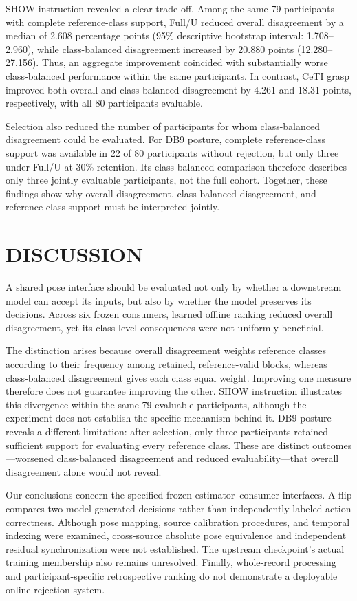 \documentclass[conference,letterpaper]{IEEEtran}
\begin{document}
SHOW instruction revealed a clear trade-off. Among the same 79 participants with complete reference-class support, Full/U reduced overall disagreement by a median of 2.608 percentage points (95\% descriptive bootstrap interval: 1.708--2.960), while class-balanced disagreement increased by 20.880 points (12.280--27.156). Thus, an aggregate improvement coincided with substantially worse class-balanced performance within the same participants. In contrast, CeTI grasp improved both overall and class-balanced disagreement by 4.261 and 18.31 points, respectively, with all 80 participants evaluable.

Selection also reduced the number of participants for whom class-balanced disagreement could be evaluated. For DB9 posture, complete reference-class support was available in 22 of 80 participants without rejection, but only three under Full/U at 30\% retention. Its class-balanced comparison therefore describes only three jointly evaluable participants, not the full cohort. Together, these findings show why overall disagreement, class-balanced disagreement, and reference-class support must be interpreted jointly.



\section{DISCUSSION}\label{discussion}
A shared pose interface should be evaluated not only by whether a downstream model can accept its inputs, but also by whether the model preserves its decisions. Across six frozen consumers, learned offline ranking reduced overall disagreement, yet its class-level consequences were not uniformly beneficial.

The distinction arises because overall disagreement weights reference classes according to their frequency among retained, reference-valid blocks, whereas class-balanced disagreement gives each class equal weight. Improving one measure therefore does not guarantee improving the other. SHOW instruction illustrates this divergence within the same 79 evaluable participants, although the experiment does not establish the specific mechanism behind it. DB9 posture reveals a different limitation: after selection, only three participants retained sufficient support for evaluating every reference class. These are distinct outcomes---worsened class-balanced disagreement and reduced evaluability---that overall disagreement alone would not reveal.

Our conclusions concern the specified frozen estimator--consumer interfaces. A flip compares two model-generated decisions rather than independently labeled action correctness. Although pose mapping, source calibration procedures, and temporal indexing were examined, cross-source absolute pose equivalence and independent residual synchronization were not established. The upstream checkpoint's actual training membership also remains unresolved. Finally, whole-record processing and participant-specific retrospective ranking do not demonstrate a deployable online rejection system.
\end{document}
